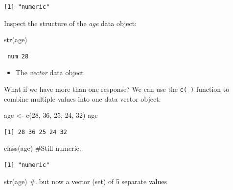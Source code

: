 \documentclass[
  letterpaper,
  DIV=11,
  numbers=noendperiod,
  oneside]{scrreprt}
\newenvironment{Shaded}{\begin{snugshade}}{\end{snugshade}}
\newcommand{\CommentTok}[1]{\textcolor[rgb]{0.37,0.37,0.37}{#1}}
\newcommand{\DecValTok}[1]{\textcolor[rgb]{0.68,0.00,0.00}{#1}}
\newcommand{\FunctionTok}[1]{\textcolor[rgb]{0.28,0.35,0.67}{#1}}
\newcommand{\NormalTok}[1]{\textcolor[rgb]{0.00,0.23,0.31}{#1}}
\newcommand{\OtherTok}[1]{\textcolor[rgb]{0.00,0.23,0.31}{#1}}
\providecommand{\tightlist}{%
  \setlength{\itemsep}{0pt}\setlength{\parskip}{0pt}}\usepackage{longtable,booktabs,array}
\begin{document}
\begin{verbatim}
[1] "numeric"
\end{verbatim}

Inspect the structure of the \emph{age} data object:

\begin{Shaded}
\begin{Highlighting}[]
\FunctionTok{str}\NormalTok{(age) }
\end{Highlighting}
\end{Shaded}

\begin{verbatim}
 num 28
\end{verbatim}

\begin{itemize}
\tightlist
\item
  The \emph{vector} data object
\end{itemize}

What if we have more than one response? We can use the \texttt{c(\ )}
function to combine multiple values into one data vector object:

\begin{Shaded}
\begin{Highlighting}[]
\NormalTok{age }\OtherTok{\textless{}{-}} \FunctionTok{c}\NormalTok{(}\DecValTok{28}\NormalTok{, }\DecValTok{36}\NormalTok{, }\DecValTok{25}\NormalTok{, }\DecValTok{24}\NormalTok{, }\DecValTok{32}\NormalTok{)}
\NormalTok{age}
\end{Highlighting}
\end{Shaded}

\begin{verbatim}
[1] 28 36 25 24 32
\end{verbatim}

\begin{Shaded}
\begin{Highlighting}[]
\FunctionTok{class}\NormalTok{(age) }\CommentTok{\#Still numeric..}
\end{Highlighting}
\end{Shaded}

\begin{verbatim}
[1] "numeric"
\end{verbatim}

\begin{Shaded}
\begin{Highlighting}[]
\FunctionTok{str}\NormalTok{(age) }\CommentTok{\#..but now a vector (set) of 5 separate values}
\end{Highlighting}
\end{Shaded}
\end{document}
